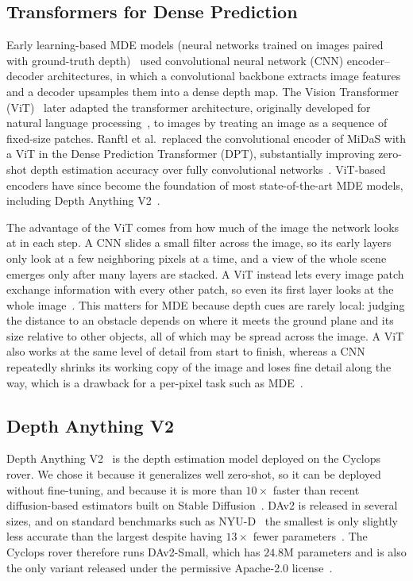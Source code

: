 \subsection{Transformers for Dense Prediction}
Early learning-based MDE models (neural networks trained on images paired with ground-truth
depth)~\cite{MiDaS,Eigen} used convolutional
neural network (CNN) encoder--decoder architectures, in which a convolutional backbone extracts
image features and a decoder upsamples them into a dense depth map. The Vision Transformer
(ViT)~\cite{ViT} later adapted the transformer architecture, originally developed for natural
language processing~\cite{Transformer}, to images by treating an image as a sequence of
fixed-size patches. Ranftl et al.\ replaced the convolutional encoder of MiDaS with a ViT in the
Dense Prediction Transformer (DPT), substantially improving zero-shot depth estimation accuracy
over fully convolutional networks~\cite{DPT}. ViT-based encoders have since become the foundation
of most state-of-the-art MDE models, including Depth Anything V2~\cite{DepthAnythingV2}.

The advantage of the ViT comes from how much of the image the network looks at in each step. A
CNN slides a small filter across the image, so its early layers only look at a few neighboring
pixels at a time, and a view of the whole scene emerges only after many layers are stacked. A ViT
instead lets every image patch exchange information with every other patch, so even its first layer
looks at the whole image~\cite{ViT}.
This matters for MDE because depth cues are rarely local: judging the distance to an obstacle
depends on where it meets the ground plane
and its size relative to other objects, all of which may be spread across the image. A ViT also
works at the same level of detail from start to finish, whereas a CNN repeatedly shrinks its
working copy of the image and loses fine detail along the way, which is a drawback for a per-pixel
task such as MDE~\cite{DPT}.




\subsection{Depth Anything V2}
\label{sec:DAV2}
Depth Anything V2~\cite{DepthAnythingV2} is the depth estimation model deployed on the Cyclops
rover. We chose it because it generalizes well zero-shot, so it can be deployed without
fine-tuning, and because it is more than $10\times$ faster than recent diffusion-based estimators
built on Stable Diffusion~\cite{DepthAnythingV2}. DAv2 is released in several sizes, and on
standard benchmarks such as NYU-D~\cite{NYUD} the smallest is only slightly less accurate than the
largest despite having $13\times$ fewer parameters~\cite{DepthAnythingV2}. The Cyclops rover
therefore runs DAv2-Small, which has $24.8$M parameters and is also the only variant released under
the permissive Apache-2.0 license~\cite{dav2github}.

